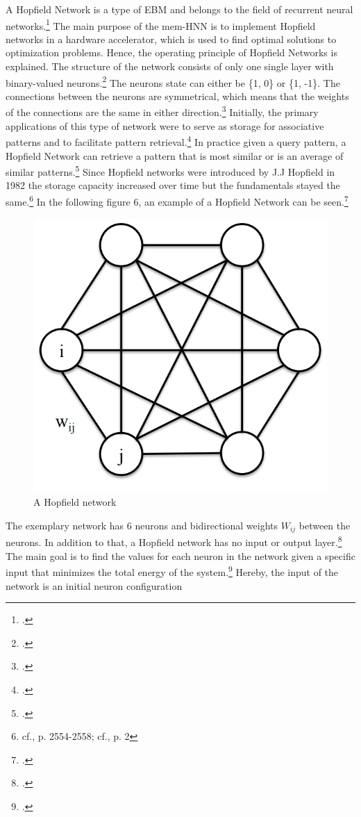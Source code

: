 A Hopfield Network is a type of \ac{EBM} and belongs to the field of recurrent neural networks.\footcite[cf.][35]{dramschChapterOne702020}
The main purpose of the \ac{mem-HNN} is to implement Hopfield networks in a hardware accelerator, which is used to find optimal solutions to optimization problems.
Hence, the operating principle of Hopfield Networks is explained. 
The structure of the network consists of only one single layer with binary-valued neurons.\footcite[cf.][7]{ahadNeuralNetworksWireless2016}
The neurons state can either be \{1, 0\} or \{1, -1\}.
The connections between the neurons are symmetrical, which means that the weights of the connections are the same in either direction.\footcite[cf.][7]{ahadNeuralNetworksWireless2016}
Initially, the primary applications of this type of network were to serve as storage for associative patterns and to facilitate pattern retrieval.\footcite[cf.][2]{ramsauerHopfieldNetworksAll2021}
In practice given a query pattern, a Hopfield Network can retrieve a pattern that is most similar or is an average of similar patterns.\footcite[cf.][2]{ramsauerHopfieldNetworksAll2021}
Since Hopfield networks were introduced by J.J Hopfield in 1982 the storage capacity increased over time but the fundamentals stayed the same.\footnote{cf.\cite{hopfieldNeuralNetworksPhysical1982}, p. 2554-2558; cf.\cite{ramsauerHopfieldNetworksAll2021}, p. 2}
In the following figure 6, an example of a Hopfield Network can be seen.\footcite[cf.][1-2]{yaoMassivelyParallelAssociative2013}
\begin{figure}[H]
    \centering
    \includegraphics[width=0.3\linewidth]{graphics/Hopfield_Netzwerk.png}
    \caption{A Hopfield network}
\end{figure}
The exemplary network has 6 neurons and bidirectional weights \( W_{ij} \) between the neurons. 
In addition to that, a Hopfield network has no input or output layer.\footcite[cf.][3]{yaoMassivelyParallelAssociative2013}
The main goal is to find the values for each neuron in the network given a specific input that minimizes the total energy of the system.\footcite[cf.][7]{ahadNeuralNetworksWireless2016}
Hereby, the input of the network is an initial neuron configuration
